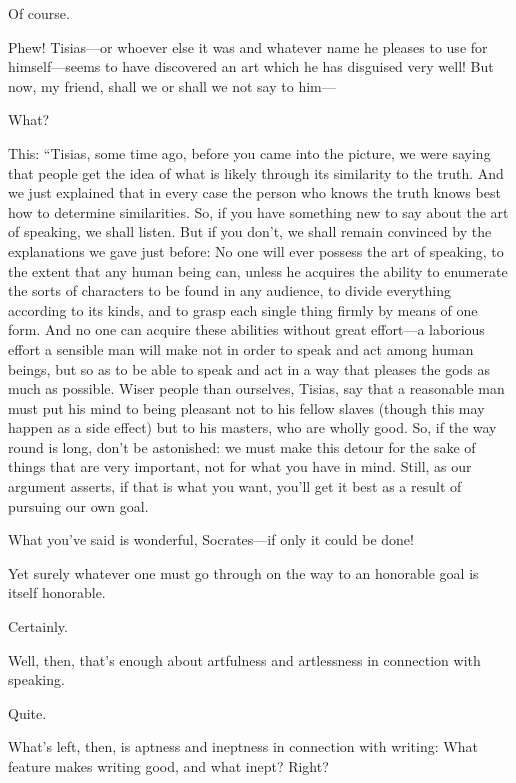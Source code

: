 \sayphaedrus Of course.

\saysocrates Phew! Tisias---or whoever else it was and whatever name he
pleases to use for
himself---seems
to have discovered an art which he has disguised very well! But now, my
friend, shall we or shall we not say to him---

\sayphaedrus What?

\saysocrates This: “Tisias, some time ago, before you came into the
picture, we were saying that people get the idea of what is likely
through its similarity to the truth. And we just explained that in every
case the person who knows the truth knows best how to determine
similarities. So, if you have something new to say about the art of
speaking, we shall listen. But if you don't, we shall remain convinced
by the explanations we gave just before: No one will ever possess the
art of speaking, to the extent that any human being can, unless
he acquires the ability to enumerate the sorts of characters to be found
in any audience, to divide everything according to its kinds, and to
grasp each single thing firmly by means of one form. And no one can
acquire these abilities without great effort---a laborious effort a
sensible man will make not in order to speak and act among human beings,
but so as to be able to speak and act in a way that pleases the gods as
much as possible. Wiser people than ourselves, Tisias, say that a
reasonable man must put his mind to being pleasant not to his fellow 
slaves (though this may happen as a side effect) but to
his masters, who are wholly good. So, if the way round is long, don't be
astonished: we must make this detour for the sake of things that are
very important, not for what you have in mind. Still, as our argument
asserts, if that is what you want, you'll get it best as a result of
pursuing our own goal.

\sayphaedrus What you've said is wonderful, Socrates---if only it could be
done!

\saysocrates Yet surely whatever one must go through on the way to
an honorable goal is itself honorable.

\sayphaedrus Certainly.

\saysocrates Well, then, that's enough about artfulness and artlessness in
connection with speaking.

\sayphaedrus Quite.

\saysocrates What's left, then, is aptness and ineptness in connection with
writing: What feature makes writing good, and what inept? Right?

